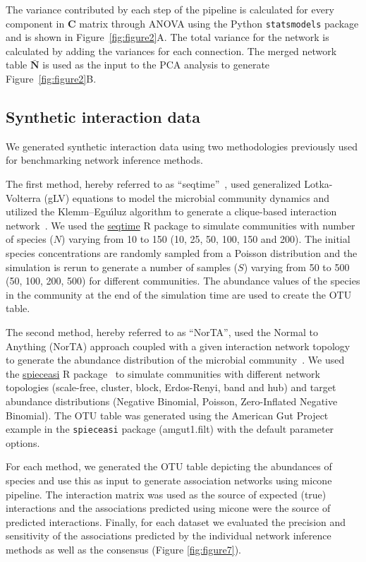   The variance contributed by each step of the pipeline is calculated for every component in $\mathbf{C}$ matrix through ANOVA using the Python \texttt{statsmodels} package and is shown in Figure~\ref{fig:figure2}A.
  The total variance for the network is calculated by adding the variances for each connection.
  The merged network table $\mathbf{\bar{N}}$ is used as the input to the PCA analysis to generate Figure~\ref{fig:figure2}B.

  \subsection*{Synthetic interaction data}
  \vspace{-5mm}

  We generated synthetic interaction data using two methodologies previously used for benchmarking network inference methods.

  The first method, hereby referred to as ``seqtime''~\cite{faustSignaturesEcologicalProcesses2018}, used generalized Lotka-Volterra (gLV) equations to model the microbial community dynamics and utilized the Klemm–Eguı́luz algorithm to generate a clique-based interaction network~\cite{Rottjers2018}.
  We used the \href{https://github.com/hallucigenia-sparsa/seqtime}{seqtime} R package to simulate communities with number of species ($N$) varying from 10 to 150 (10, 25, 50, 100, 150 and 200).
  The initial species concentrations are randomly sampled from a Poisson distribution and the simulation is rerun to generate a number of samples ($S$) varying from 50 to 500 (50, 100, 200, 500) for different communities.
  The abundance values of the species in the community at the end of the simulation time are used to create the OTU table.

  The second method, hereby referred to as ``NorTA'', used the Normal to Anything (NorTA) approach coupled with a given interaction network topology to generate the abundance distribution of the microbial community~\cite{Kurtz2015}.
  We used the \href{https://github.com/zdk123/SpiecEasi}{spieceasi} R package~\cite{Kurtz2015} to simulate communities with different network topologies (scale-free, cluster, block, Erdos-Renyi, band and hub) and target abundance distributions (Negative Binomial, Poisson, Zero-Inflated Negative Binomial).
  The OTU table was generated using the American Gut Project example in the \texttt{spieceasi} package (amgut1.filt) with the default parameter options.

  For each method, we generated the OTU table depicting the abundances of species and use this as input to generate association networks using \ac{micone} pipeline.
  The interaction matrix was used as the source of expected (true) interactions and the associations predicted using \ac{micone} were the source of predicted interactions.
  Finally, for each dataset we evaluated the precision and sensitivity of the associations predicted by the individual network inference methods as well as the consensus (Figure \ref{fig:figure7}).


